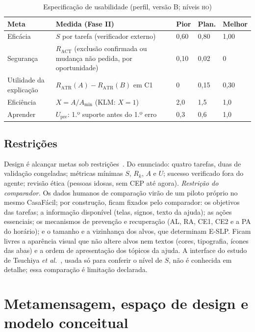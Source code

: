 \documentclass[conference]{IEEEtran}
\newcommand{\stHO}{\textsc{ho}}
\begin{document}
\begin{table}[!t]
\caption{Especificação de usabilidade (perfil, versão B; níveis \stHO)}
\label{tab:especificacao}
\centering
\scriptsize
\setlength{\tabcolsep}{2.5pt}
\begin{tabularx}{\columnwidth}{@{}P{1.35cm}Y P{0.75cm}P{0.75cm}P{0.75cm}@{}}
\toprule
\textbf{Meta} & \textbf{Medida (Fase II)} & \textbf{Pior} & \textbf{Plan.} & \textbf{Melhor} \\
\midrule
Eficácia & $S$ por tarefa (verificador externo) & 0,60 & 0,80 & 1,00 \\
Segurança & $R_{\mathrm{ACT}}$ (exclusão confirmada ou mudança não pedida, por oportunidade) & 0,10 & 0,02 & 0 \\
Utilidade da explicação & $R_{\mathrm{ATR}}(A) - R_{\mathrm{ATR}}(B)$ em C1 & 0 & 0,15 & 0,30 \\
Eficiência & $X = A/A_{\min}$ (KLM: $X=1$) & 2,0 & 1,5 & 1,0 \\
Aprender & $U_{\mathrm{pre}}$: 1.º suporte antes do 1.º erro & 0,3 & 0,6 & 1,0 \\
\bottomrule
\end{tabularx}
\end{table}

\subsection{Restrições}
Design é alcançar metas sob restrições~\cite[cap.~5]{dix2004}. Do enunciado: quatro tarefas, duas de validação congeladas; métricas mínimas $S$, $R_k$, $A$ e $U$; sucesso verificado fora do agente; revisão ética (pessoas idosas, sem CEP até agora). \textit{Restrição do comparador.} Os dados humanos de comparação virão de um piloto próprio no mesmo CasaFácil; por construção, ficam fixados pelo comparador: os objetivos das tarefas; a informação disponível (telas, signos, texto da ajuda); as ações essenciais; os mecanismos de prevenção e recuperação (AL, RA, CE1, CE2 e a PA do horário); e o tamanho e a vizinhança dos alvos, que determinam E-SLP. Ficam livres a aparência visual que não altere alvos nem textos (cores, tipografia, ícones das abas) e a ordem de apresentação dos tópicos da ajuda. A interface do estudo de Tsuchiya \textit{et al.}~\cite{tsuchiya2018}, usada só para conferir o nível de $S$, não é conhecida em detalhe; essa comparação é limitação declarada.

\section{Metamensagem, espaço de design e modelo conceitual}\label{sec:meta}
\end{document}
